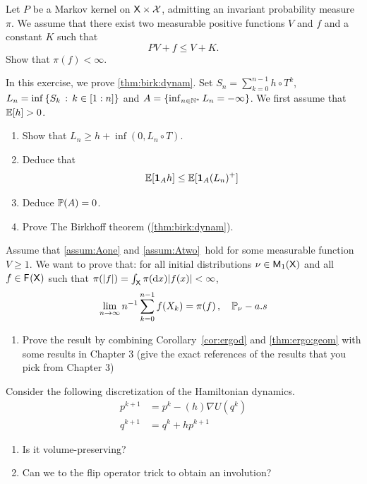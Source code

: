 \documentclass[english,graybox,envcountchap,envcountsame,sectrefs,shortlabels]{svmono}
\theoremstyle{style}
\begin{document}
\begin{exercise}
Let $P$ be a Markov kernel on $\mathsf{X}\times\mathcal{X}$, admitting an
invariant probability measure $\pi$. We assume that there exist two
measurable positive functions $V$ and $f$ and a constant $K$ such
that
\[
PV+f\leq V+K. 
\]
Show that $\pi(f)<\infty$.
\end{exercise}

\begin{exercise} \label{exo:birk}
In this exercise, we prove \autoref{thm:birk:dynam}.
Set $S_n=\sum_{k=0}^{n-1}h\circ T^{k}$, $L_n=\inf\left\{ S_k\,:\,k\in[1:n]\right\}$ and $A=\left\{ \inf_{n\in\mathbb{N}^*}L_n=-\infty\right\}$.
We first assume that $\mathbb{E}[h]>0$.
\begin{enumerate}
\item Show that $L_n \geq h+\inf(0,L_n\circ T)$.
\item Deduce that
$$
\mathbb{E}[\mathbf{1}_{A} h] \leq \mathbb{E}[\mathbf{1}_{A} (L_n)^+]
$$
\item Deduce $\mathbb{P}(A)=0$.
\item Prove The Birkhoff theorem (\autoref{thm:birk:dynam}).
\end{enumerate}
\end{exercise}

%
\begin{exercise}\label{exo:LLN:Aone:Atwo}
Assume that \ref{assum:Aone} and \ref{assum:Atwo}\ hold for some measurable function $V\geq 1$. We want to prove that: for all initial
distributions $\nu\in\mathsf{M}_{1}(\mathsf{X})$ and all $f\in\mathsf{F_{}}(\mathsf{X})$
such that $\pi(|f|)=\int_{\mathsf{X}}\pi(\mathrm{d} x)|f(x)|<\infty$,
\begin{equation}
\lim_{n\to\infty}n^{-1}\sum_{k=0}^{n-1}f(X_{k})=\pi(f)\,,\quad\mathbb{P}_{\nu}-a.s\label{eq:LLN:gener}
\end{equation}
\begin{enumerate}
\item Prove the result by combining Corollary~\ref{cor:ergod} and \autoref{thm:ergo:geom} with some results in Chapter 3 (give the exact references of the results that you pick from Chapter 3)
\end{enumerate}
\end{exercise}

\begin{exercise} \label{exo:discretiz:Hamilton}
Consider the following discretization of the Hamiltonian dynamics.
\begin{align}
p^{k+1}&=p^k-(h) \nabla U(q^k) \nonumber\\
q^{k+1}&=q^k+h p^{k+1} \label{eq:leap:update}
\end{align}
\begin{enumerate}
\item Is it volume-preserving?
\item Can we to the flip operator trick to obtain an involution?
\end{enumerate}
\end{exercise}


\printindex
\end{document}
